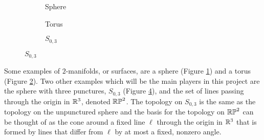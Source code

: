 \documentclass{amsart}
\begin{document}
	\begin{figure}[h]
		\centering
		\begin{subfigure}{0.3\textwidth}
			\centering
			\caption{Sphere}
			\label{fig:example_sphere}
		\end{subfigure}
		\hfill
		\begin{subfigure}{0.3\textwidth}
			\centering
			\caption{Torus}
			\label{fig:example_torus}
		\end{subfigure}
		\hfill
		\begin{subfigure}{0.3\textwidth}
			\centering
			\caption{$S_{0,3}$}
			\label{fig:example_thice_punctured_sphere}
		\end{subfigure}
	\end{figure}
	
	Some examples of $2$-manifolds, or surfaces, are a sphere (Figure \ref{fig:example_sphere}) and a torus (Figure \ref{fig:example_torus}). Two other examples which will be the main players in this project are the sphere with three punctures, $S_{0,3}$ (Figure \ref{fig:example_thice_punctured_sphere}), and the set of lines passing through the origin in $\mathbb{R}^3$, denoted $\mathbb{RP}^2$. The topology on $S_{0,3}$ is the same as the topology on the unpunctured sphere and the basis for the topology on $\mathbb{RP}^2$ can be thought of as the cone around a fixed line $\ell$ through the origin in $\mathbb{R}^3$ that is formed by lines that differ from $\ell$ by at most a fixed, nonzero angle.
	
\end{document}
